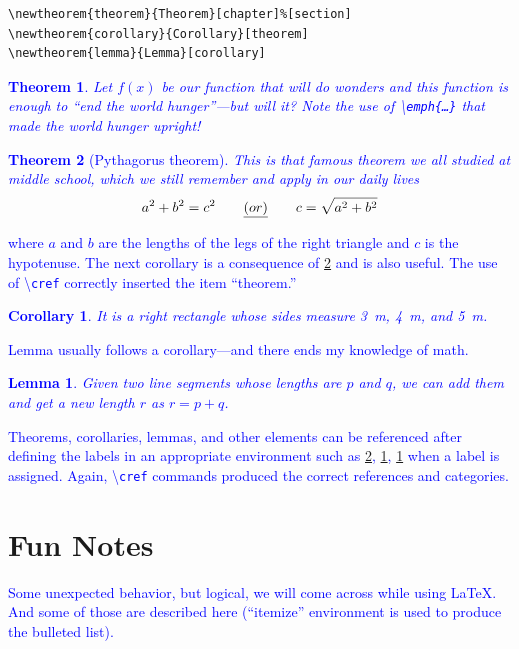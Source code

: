 \documentclass[phd]{ndsu-thesis-2022}
\newtheorem{theorem}{Theorem}[chapter]%
\newtheorem{corollary}{Corollary}[theorem]
\newtheorem{lemma}{Lemma}[corollary]
\newcommand\italk[1]{\textcolor{blue}{#1}}  %
\newcommand\cmd[1]{\textbackslash\texttt{#1}}  %
\begin{document}
\begin{verbatim}
\newtheorem{theorem}{Theorem}[chapter]%[section]
\newtheorem{corollary}{Corollary}[theorem]
\newtheorem{lemma}{Lemma}[corollary]
\end{verbatim}

\vspace{-0.5in}
\italk{
\begin{theorem}
Let \(f(x)\) be our function that will do wonders and this function is enough to \emph{``end the world hunger''}---but will it? Note the use of \cmd{emph\{\ldots\}} that made the world hunger upright!
\end{theorem}
\begin{theorem}[Pythagorus theorem]
\label{pytha}
This is that famous theorem we all studied at middle school, which we still remember and apply in our daily lives 
\vspace{6ex} 
\[ a^2 + b^2 = c^2  \qquad \emph{(or)} \qquad c = \sqrt{a^2 + b^2} \] 
\end{theorem}
\vspace{-3ex} 
\noindent where $a$ and $b$ are the lengths of the legs of the right triangle and $c$ is the hypotenuse. 
The next corollary is a consequence of \cref{pytha} and is also useful. The use of \cmd{cref} correctly inserted the item ``theorem.''
\begin{corollary}
It is a right rectangle whose sides measure \qty{3}{m}, \qty{4}{m}, and \qty{5}{m}.
\label{coro}
\end{corollary}
Lemma usually follows a corollary---and there ends my knowledge of math.
\begin{lemma}
Given two line segments whose lengths are $p$ and $q$, we can add them and get a new length $r$ as \(r=p+q\).
\label{lem}
\end{lemma}
Theorems, corollaries, lemmas, and other elements can be referenced after defining the labels in an appropriate environment such as \cref{pytha}, \cref{coro}, \cref{lem} when a label is assigned. Again, \cmd{cref} commands produced the correct references and categories. 
}

\section{Fun Notes}
\italk{Some unexpected behavior, but logical, we will come across while using \LaTeX. And some of those are described here (``itemize'' environment is used to produce the bulleted list).}
\end{document}
